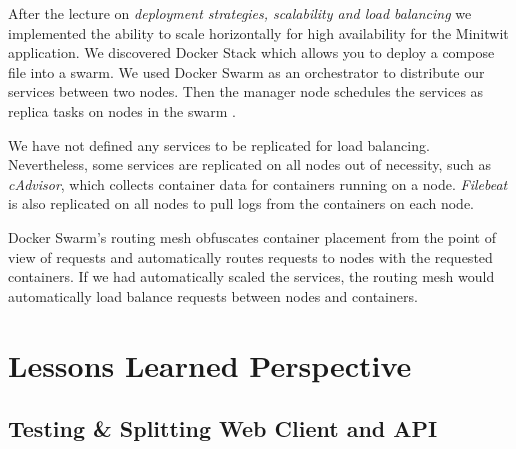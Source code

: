\documentclass{article}
\begin{document}
After the lecture on \textit{deployment strategies, scalability and load balancing} we implemented the ability to scale horizontally for high availability for the Minitwit application. We discovered Docker Stack which allows you to deploy a compose file into a swarm. We used Docker Swarm as an orchestrator to distribute our services between two nodes. Then the manager node schedules the services as replica tasks on nodes in the swarm \cite{docker-swarm-docs}.

We have not defined any services to be replicated for load balancing. Nevertheless, some services are replicated on all nodes out of necessity, such as \textit{cAdvisor}, which collects container data for containers running on a node. \textit{Filebeat} is also replicated on all nodes to pull logs from the containers on each node.

Docker Swarm's routing mesh obfuscates container placement from the point of view of requests and automatically routes requests to nodes with the requested containers. If we had automatically scaled the services, the routing mesh would automatically load balance requests between nodes and containers.



\section{Lessons Learned Perspective}




\subsection{Testing \& Splitting Web Client and API}
\end{document}
